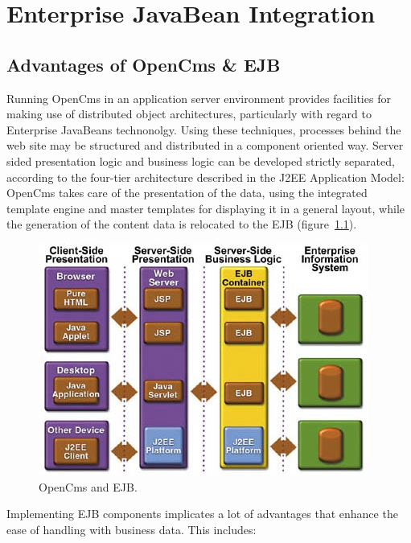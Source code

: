 \chapter {Enterprise JavaBean Integration}
\section {Advantages of OpenCms \& EJB}
Running OpenCms in an application server environment provides facilities
for making use of distributed object architectures, particularly with
regard to Enterprise JavaBeans  technonolgy. Using these techniques,
processes behind the web site may be structured and distributed in a
component oriented way. Server sided presentation logic and business
logic can be developed strictly separated, according to the four-tier
architecture described in the J2EE Application Model: OpenCms takes care
of the presentation of the data, using the integrated template engine
and master templates for displaying it in a general layout, while the
generation of the content data is relocated to the EJB (figure~\ref{EJB}).

\begin{figure}
\begin{center}
\includegraphics[clip,width=\sgw]{pics/ejb/ejb}
\end{center}
\caption[OpenCms and EJB]{OpenCms and EJB.}
\label{EJB}
\end{figure}

Implementing EJB components implicates a lot of advantages that enhance
the ease of handling with business data. This includes:

